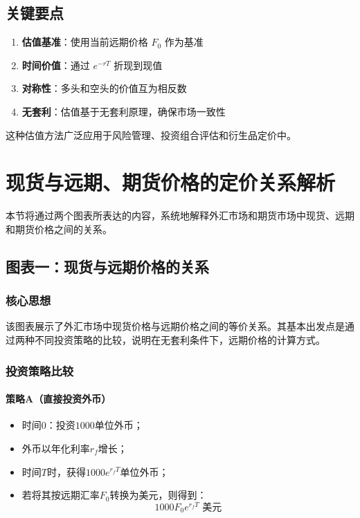 \subsection{关键要点}

\begin{enumerate}
\item \textbf{估值基准}：使用当前远期价格 $F_0$ 作为基准
\item \textbf{时间价值}：通过 $e^{-rT}$ 折现到现值
\item \textbf{对称性}：多头和空头的价值互为相反数
\item \textbf{无套利}：估值基于无套利原理，确保市场一致性
\end{enumerate}

这种估值方法广泛应用于风险管理、投资组合评估和衍生品定价中。


\section{现货与远期、期货价格的定价关系解析}

本节将通过两个图表所表达的内容，系统地解释外汇市场和期货市场中现货、远期和期货价格之间的关系。

\subsection{图表一：现货与远期价格的关系}

\subsubsection{核心思想}
该图表展示了外汇市场中现货价格与远期价格之间的等价关系。其基本出发点是通过两种不同投资策略的比较，说明在无套利条件下，远期价格的计算方式。

\subsubsection{投资策略比较}

\paragraph{策略A（直接投资外币）}
\begin{itemize}
  \item 时间$0$：投资$1000$单位外币；
  \item 外币以年化利率$r_f$增长；
  \item 时间$T$时，获得$1000e^{r_f T}$单位外币；
  \item 若将其按远期汇率$F_0$转换为美元，则得到：
  \[
  1000F_0 e^{r_f T} \text{ 美元}
  \]
\end{itemize}

